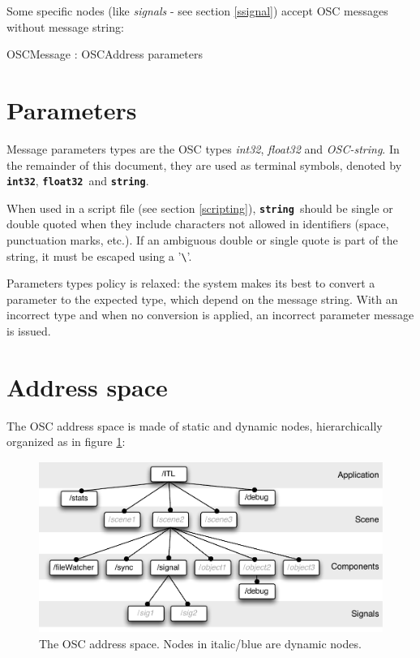 \documentclass[a4paper,twoside]{report}
\newcommand{\sublevel}[1]	{\section{#1}}
\newcommand{\osctype}[1]	{\textbf{\texttt{{\small #1}}}}
\newcommand{\oscint}		{\osctype{int32}}
\newcommand{\oscfloat}	{\osctype{float32}}
\newcommand{\oscstring}	{\osctype{string}}
\begin{document}
Some specific nodes (like \emph{signals} - see section \ref{ssignal}) accept OSC messages without message string:
\begin{rail}
OSCMessage : OSCAddress parameters
\end{rail}

\sublevel{Parameters}

Message parameters types are the OSC types \emph{int32}, \emph{float32} and \emph{OSC-string}. In the remainder of this document, they are used as terminal symbols, denoted by \oscint, \oscfloat\ and \oscstring. 

When used in a script file (see section \ref{scripting}), \oscstring\ should be single or double quoted when they include characters not allowed in identifiers (space, punctuation marks, etc.).
If an ambiguous double or single quote is part of the string, it must be escaped using a '\verb+\+'.

Parameters types policy is relaxed: the system makes its best to convert a parameter to the expected type, which depend on the message string. With an incorrect type and when no conversion is applied, an incorrect parameter message is issued.

\sublevel{Address space}
The OSC address space is made of static and dynamic nodes, hierarchically organized as in figure \ref{fig:addrspace}:

\begin{figure}[h]
	\centering \includegraphics[width=120mm]{imgs/address_space}
 \caption{The OSC address space. Nodes in italic/blue are dynamic nodes.}
 \label{fig:addrspace}
\end{figure}
\end{document}
